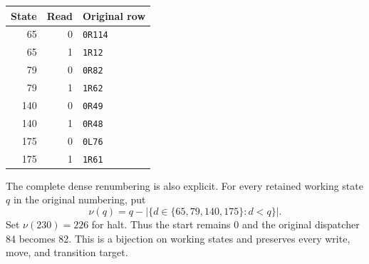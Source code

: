 \begin{center}\begin{tabular}{@{}rrl@{}}
\toprule State & Read & Original row\\\midrule
65 & 0 & \texttt{0R114}\\
65 & 1 & \texttt{1R12}\\
79 & 0 & \texttt{0R82}\\
79 & 1 & \texttt{1R62}\\
140 & 0 & \texttt{0R49}\\
140 & 1 & \texttt{0R48}\\
175 & 0 & \texttt{0L76}\\
175 & 1 & \texttt{1R61}\\
\bottomrule\end{tabular}\end{center}
The complete dense renumbering is also explicit. For every retained
working state $q$ in the original numbering, put
\[\nu(q)=q-\bigl|\{d\in\{65,79,140,175\}:d<q\}\bigr|.
\]
Set $\nu(230)=226$ for halt. Thus the start remains 0 and
the original dispatcher 84 becomes 82. This is a bijection on
working states and preserves every write, move, and transition target.
